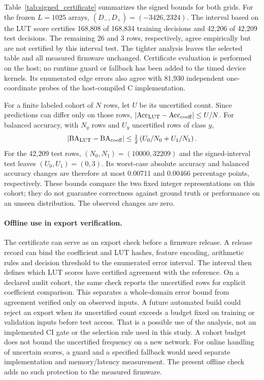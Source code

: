 Table~\ref{tab:signed_certificate} summarizes the signed bounds for both grids.
For the frozen $L=1025$ arrays, $(D_-,D_+)=(-3426,2324)$.
The interval based on the LUT score certifies 168,808 of 168,834 training
decisions and 42,206 of 42,209 test decisions. The remaining 26 and 3 rows,
respectively, agree empirically but are not certified by this interval test.
The tighter analysis leaves the selected table and all measured firmware
unchanged. Certificate evaluation is performed on the host; no runtime
guard or fallback has been added to the timed device kernels. Its enumerated edge errors also agree with 81,930 independent
one-coordinate probes of the host-compiled C implementation.

For a finite labeled cohort of $N$ rows, let $U$ be its uncertified count.
Since predictions can differ only on those rows,
$|\mathrm{Acc}_{\rm LUT}-\mathrm{Acc}_{\rm coeff}|\leq U/N$.
For balanced accuracy, with $N_y$ rows and $U_y$ uncertified rows of class $y$,
\begin{equation}
 |\mathrm{BA}_{\rm LUT}-\mathrm{BA}_{\rm coeff}|
 \leq \tfrac12\left(U_0/N_0+U_1/N_1\right).
 \label{eq:certificate_metric_bound}
\end{equation}
For the 42,209 test rows, $(N_0,N_1)=(10000,32209)$ and the signed-interval
test leaves $(U_0,U_1)=(0,3)$. Its worst-case absolute accuracy and balanced
accuracy changes are therefore at most 0.00711 and 0.00466 percentage points,
respectively. These bounds compare the two fixed integer representations
on this cohort; they do not guarantee correctness against ground truth or
performance on an unseen distribution. The observed changes are zero.

\paragraph{Offline use in export verification.}
The certificate can serve as an export check before a firmware release.
A release record can bind the coefficient and LUT hashes, feature encoding,
arithmetic rules and decision threshold to the enumerated error interval.
The interval then defines which LUT scores have certified agreement with
the reference. On a declared audit cohort, the same check reports the
uncertified rows for explicit coefficient comparison. This separates a
whole-domain error bound from agreement verified only on observed inputs.
A future automated build could reject an export when its uncertified count
exceeds a budget fixed on training or validation inputs before test access.
That is a possible use of the analysis, not an implemented CI gate or the
selection rule used in this study. A cohort budget does not bound the
uncertified frequency on a new network. For online handling of uncertain
scores, a guard and a specified fallback would need separate implementation
and memory/latency measurement. The present offline check adds no such
protection to the measured firmware.

